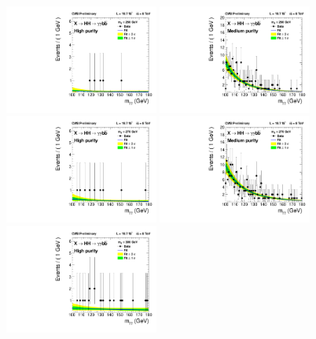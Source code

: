 \begin{figure}[ht]
 \begin{center}
   \includegraphics[width=0.45\textwidth]{figures/results/databkgoversig_cat0_260GeV.pdf}
   \includegraphics[width=0.45\textwidth]{figures/results/databkgoversig_cat1_260GeV.pdf}
   \includegraphics[width=0.45\textwidth]{figures/results/databkgoversig_cat0_270GeV.pdf}
   \includegraphics[width=0.45\textwidth]{figures/results/databkgoversig_cat1_270GeV.pdf}
   \includegraphics[width=0.45\textwidth]{figures/results/databkgoversig_cat0_300GeV.pdf}

\end{center}
\end{figure}
